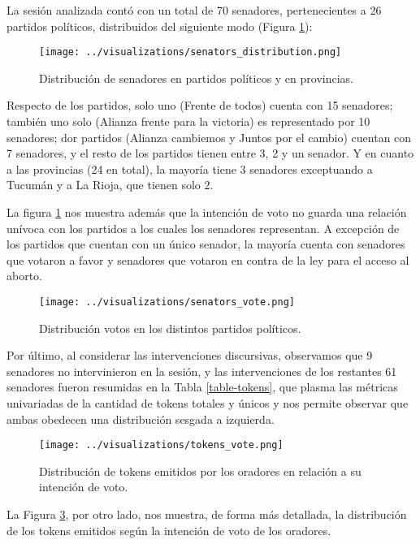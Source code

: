 La sesión analizada contó con un total de 70 senadores,
pertenecientes a 26 partidos políticos, distribuidos del
siguiente modo (Figura \ref{fig-distrib-senators}):

\begin{figure}[h!]
\centering
\texttt{[image: ../visualizations/senators\_distribution.png]}
\caption{Distribución de senadores en partidos políticos y en provincias.}
\label{fig-distrib-senators}
\end{figure}

Respecto de los partidos, solo uno (Frente de todos) cuenta con 15
senadores; también uno solo (Alianza frente para la victoria) es
representado por 10 senadores; dor partidos (Alianza cambiemos y
Juntos por el cambio) cuentan con 7 senadores, y el resto de los
partidos tienen entre 3, 2 y un senador. Y en cuanto a las provincias
(24 en total), la mayoría tiene 3 senadores exceptuando a Tucumán y
a La Rioja, que tienen solo 2.

La figura \ref{fig-distrib-senators} nos muestra además que la intención
de voto no guarda una relación unívoca con los partidos a los cuales los
senadores representan. A excepción de los partidos que cuentan con un único
senador, la mayoría cuenta con senadores que votaron a favor y senadores
que votaron en contra de la ley para el acceso al aborto.

\begin{figure}[h!]
\centering
\texttt{[image: ../visualizations/senators\_vote.png]}
\caption{Distribución votos en los distintos partidos políticos.}
\label{fig-distrib-vote}
\end{figure}

Por último, al considerar las intervenciones discursivas, observamos que
9 senadores no intervinieron en la sesión, y las intervenciones de los
restantes 61 senadores fueron resumidas en la Tabla \ref{table-tokens}, que plasma
las métricas univariadas de la cantidad de tokens totales y únicos y nos
permite observar que ambas obedecen una distribución sesgada a izquierda.

\begin{figure}[h!]
\centering
\texttt{[image: ../visualizations/tokens\_vote.png]}
\caption{Distribución de tokens emitidos por los oradores en relación a
su intención de voto.}
\label{fig-distrib-tokens-vote}
\end{figure}

La Figura \ref{fig-distrib-tokens-vote}, por otro lado, nos muestra,
de forma más detallada, la distribución de los tokens emitidos según
la intención de voto de los oradores.

